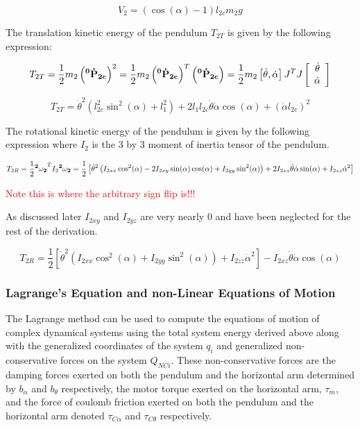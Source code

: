 \documentclass{article}
\newcommand{\xxx}[1]{\textcolor{red}{#1}}
\theoremstyle{plain}
\theoremstyle{definition}
\theoremstyle{remark}
\begin{document}
$$ V_{2} = \left( \cos(\alpha) - 1 \right) l_{2c} m_2 g $$

The translation kinetic energy of the pendulum $T_{2T}$ is given by the following expression: 

$$ T_{2T} = \frac{1}{2} m_{2} \left( \bf{^0\dot{P}_{2c}} \right)^2 = \frac{1}{2} m_{2} \left( \bf{^0\dot{P}_{2c}} \right)^T\left( \bf{^0\dot{P}_{2c}} \right) = \frac{1}{2} m_{2} \left[ \dot{\theta}, \dot{\alpha} \right] J^T J \left[ \begin{array}{c l} \dot{\theta} \\ \dot{\alpha} \end{array} \right] $$

$$ T_{2T} = \dot{\theta}^2 \left( l_{2c}^2  \sin^2(\alpha)  + l_{1}^2 \right) + 2 l_{1} l_{2c} \dot{\theta} \dot{\alpha} \cos(\alpha) + \left( \dot{\alpha} l_{2c} \right)^2 $$

The rotational kinetic energy of the pendulum is given by the following expression where $I_{2}$ is the 3 by 3 moment of inertia tensor of the pendulum. 

$$ T_{2R} = \frac{1}{2} {\bf{^2\omega_{2}}}^T I_{2} {\bf{ ^2 \omega_{2}}} = \frac{1}{2} \left[ \dot{\theta}^2 \left(I_{2xx} \cos^2(\alpha) - 2 I_{2xy} \sin(\alpha)  \cos(\alpha) + I_{2yy}  \sin^2(\alpha)  \right) + 2 I_{2xz} \dot{\theta} \dot{\alpha} \sin(\alpha) + I_{2zz} \dot{\alpha}^2 \right]$$

\xxx{Note this is where the arbitrary sign flip is!!!}

As discussed later $I_{2xy}$ and $I_{2yz}$ are very nearly $0$ and have been neglected for the rest of the derivation.

$$T_{2R} = \frac{1}{2} \left[ \dot{\theta}^2 \left( I_{2xx} \cos^2(\alpha) + I_{2yy} \sin^2(\alpha) \right) + I_{2zz} \dot{\alpha}^2 \right] - I_{2xz} \dot{\theta} \dot{\alpha} \cos(\alpha) $$

\subsubsection*{Lagrange's Equation and non-Linear Equations of Motion}
The Lagrange method can be used to compute the equations of motion of complex dynamical systems using the total system energy derived above along with the generalized coordinates of the system $q_{i}$ and generalized non-conservative forces on the system $Q_{NCi}$.  These non-conservative forces are the damping forces exerted on both the pendulum and the horizontal arm determined by $b_\alpha$ and $b_\theta$ respectively,  the motor torque exerted on the horizontal arm, $\tau_{m}$, and the force of coulomb friction exerted on both the pendulum and the horizontal arm denoted $\tau_{C \alpha}$ and $\tau_{C \theta}$ respectively.  
\end{document}
